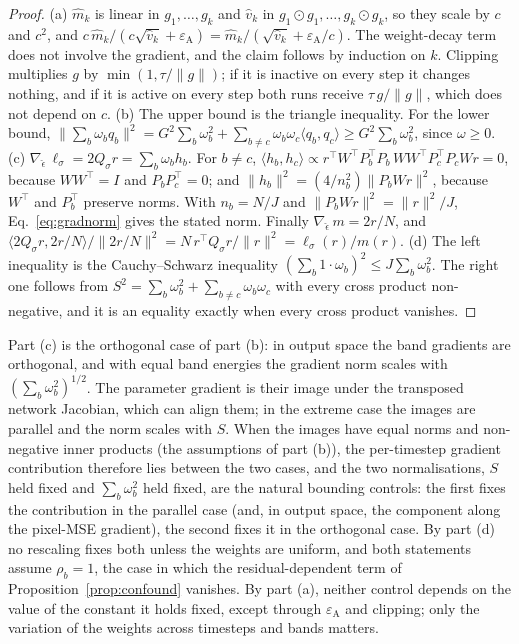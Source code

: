 \begin{proof}
(a) $\hat m_k$ is linear in $g_1, \dots, g_k$ and $\hat v_k$ in
$g_1 \odot g_1, \dots, g_k \odot g_k$, so they scale by $c$ and $c^2$, and
$c\,\hat m_k/(c\sqrt{\hat v_k} + \varepsilon_{\mathrm{A}})
= \hat m_k/(\sqrt{\hat v_k} + \varepsilon_{\mathrm{A}}/c)$. The weight-decay term
does not involve the gradient, and the claim follows by induction on $k$.
Clipping multiplies $g$ by $\min(1, \tau/\lVert g \rVert)$; if it is inactive on
every step it changes nothing, and if it is active on every step both runs
receive $\tau\, g/\lVert g \rVert$, which does not depend on $c$.
(b) The upper bound is the triangle inequality. For the lower bound,
$\lVert \sum_b \omega_b q_b \rVert^2
= G^2 \sum_b \omega_b^2 + \sum_{b \neq c} \omega_b \omega_c \langle q_b, q_c \rangle
\ge G^2 \sum_b \omega_b^2$, since $\omega \ge 0$.
(c) $\nabla_{\hat\epsilon}\, \ell_\sigma = 2 Q_\sigma r = \sum_b \omega_b h_b$. For
$b \neq c$,
$\langle h_b, h_c \rangle \propto r^\top W^\top P_b^\top P_b\, W W^\top P_c^\top P_c W r = 0$,
because $W W^\top = I$ and $P_b P_c^\top = 0$; and
$\lVert h_b \rVert^2 = (4/n_b^2)\lVert P_b W r \rVert^2$, because $W^\top$ and
$P_b^\top$ preserve norms. With $n_b = N/J$ and
$\lVert P_b W r \rVert^2 = \lVert r \rVert^2/J$, Eq.~\eqref{eq:gradnorm} gives the
stated norm. Finally $\nabla_{\hat\epsilon}\, m = 2r/N$, and
$\langle 2 Q_\sigma r, 2r/N \rangle / \lVert 2r/N \rVert^2
= N\, r^\top Q_\sigma r / \lVert r \rVert^2 = \ell_\sigma(r)/m(r)$.
(d) The left inequality is the Cauchy--Schwarz inequality
$(\sum_b 1 \cdot \omega_b)^2 \le J \sum_b \omega_b^2$. The right one follows
from $S^2 = \sum_b \omega_b^2 + \sum_{b \neq c} \omega_b \omega_c$ with every cross
product non-negative, and it is an equality exactly when every cross product
vanishes.
\end{proof}

Part (c) is the orthogonal case of part (b): in output space the band
gradients are orthogonal, and with equal band energies the gradient norm scales
with $(\sum_b \omega_b^2)^{1/2}$. The parameter gradient is their image under
the transposed network Jacobian, which can align them; in the extreme case the
images are parallel and the norm scales with $S$. When the images have equal
norms and non-negative inner products (the assumptions of part (b)), the
per-timestep gradient contribution therefore lies between the two cases, and
the two normalisations,
$S$ held fixed and $\sum_b \omega_b^2$ held fixed, are the natural bounding
controls: the first fixes the contribution in the parallel case (and, in output
space, the component along the pixel-MSE gradient), the second fixes it in the
orthogonal case. By part (d) no rescaling fixes both unless the weights are
uniform, and both statements assume $\rho_b = 1$, the case in which the
residual-dependent term of Proposition~\ref{prop:confound} vanishes. By part
(a), neither control depends on the value of the constant it holds fixed,
except through $\varepsilon_{\mathrm{A}}$ and clipping; only the variation of
the weights across timesteps and bands matters.


